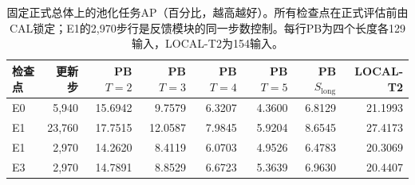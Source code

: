 \begin{table}[t]
\centering
\caption{固定正式总体上的池化任务AP（百分比，越高越好）。所有检查点在正式评估前由CAL锁定；E1的2,970步行是反馈模块的同一步数控制。每行PB为四个长度各129输入，LOCAL-T2为154输入。}
\label{tab:formal-native}
\begin{tabular}{lrrrrrrr}
\toprule
检查点 & 更新步 & PB $T=2$ & PB $T=3$ & PB $T=4$ & PB $T=5$ & PB $S_{\mathrm{long}}$ & LOCAL-T2 \\
\midrule
E0 & 5,940 & 15.6942 & 9.7579 & 6.3207 & 4.3600 & 6.8129 & 21.1993 \\
E1 & 23,760 & 17.7515 & 12.0587 & 7.9845 & 5.9204 & 8.6545 & 27.4173 \\
E1 & 2,970 & 14.2620 & 8.4119 & 6.0703 & 4.9526 & 6.4783 & 20.3069 \\
E3 & 2,970 & 14.7891 & 8.8529 & 6.6723 & 5.3639 & 6.9630 & 20.4407 \\
\bottomrule
\end{tabular}
\end{table}

